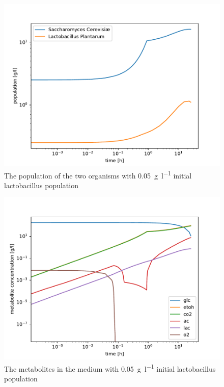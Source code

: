 		\begin{figure}[h]
			\includegraphics[width=\linewidth]{figures/results/cocultures/0_1_populations.pdf}
			\caption{The population of the two organisms with \SI{0.05}{\gram\per\litre} initial lactobacillus population}
			\label{fig:cocult_0.1_pop}
		\end{figure}
		
		\begin{figure}[h]
			\includegraphics[width=\linewidth]{figures/results/cocultures/0_1_metabolites.pdf}
			\caption{The metabolites in the medium with \SI{0.05}{\gram\per\litre} initial lactobacillus population}
			\label{fig:cocult_0.1_met}
		\end{figure}
		
